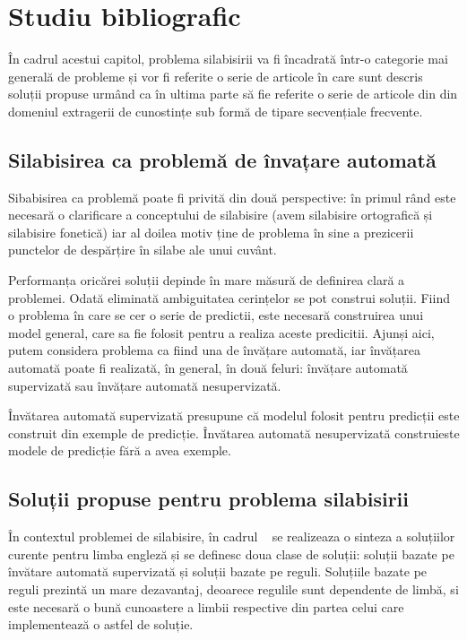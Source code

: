 \chapter{Studiu bibliografic}
\label{cap:studiu-bibliografic}

În cadrul acestui capitol, problema silabisirii va fi încadrată într-o categorie mai generală de probleme și vor fi referite o serie de articole în care sunt descris soluții propuse urmând ca în ultima parte să fie referite o serie de articole din din domeniul extragerii de cunostințe sub formă de tipare secvențiale frecvente.

\section{Silabisirea ca problemă de învațare automată}

Sibabisirea ca problemă poate fi privită din două perspective: în primul rând este necesară o clarificare a conceptului de silabisire (avem silabisire ortografică și silabisire fonetică) iar al doilea motiv ține de problema în sine a prezicerii punctelor de despărțire în silabe ale unui cuvânt. 

Performanța oricărei soluții depinde în mare măsură de definirea clară a problemei. Odată eliminată ambiguitatea cerințelor se pot construi soluții. Fiind o problema în care se cer o serie de predictii, este necesară construirea unui model general, care sa fie folosit pentru a realiza aceste predicitii. Ajunși aici, putem considera problema ca fiind una de învățare automată, iar învățarea automată poate fi realizată, în general, în două feluri: învățare automată supervizată sau învățare automată nesupervizată. 

Învătarea automată supervizată presupune că modelul folosit pentru predicții este construit din exemple de predicție. Învătarea automată nesupervizată construieste modele de predicție fără a avea exemple. 

\section{Soluții propuse pentru problema silabisirii}

În contextul problemei de silabisire, în cadrul ~\cite{bib:marchand2009automatic} se realizeaza o sinteza a soluțiilor curente pentru limba engleză și se definesc doua clase de soluții: soluții bazate pe învătare automată supervizată și soluții bazate pe reguli. Soluțiile bazate pe reguli prezintă un mare dezavantaj, deoarece regulile sunt dependente de limbă, si este necesară o bună cunoastere a limbii respective din partea celui care implementează o astfel de soluție.

